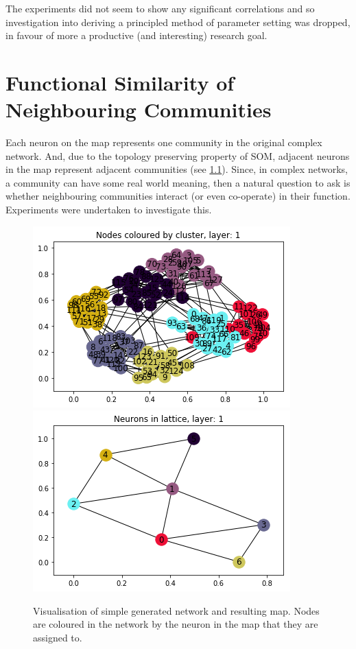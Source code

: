 \documentclass{report}
\begin{document}
	The experiments did not seem to show any significant correlations and so investigation into deriving a principled method of parameter setting was dropped, in favour of more a productive (and interesting) research goal.
	
	
	\chapter{Functional Similarity of Neighbouring Communities}
	
	Each neuron on the map represents one community in the original complex network. And, due to the topology preserving property of SOM, adjacent neurons in the map represent adjacent communities (see \cref{colouring}). Since, in complex networks, a community can have some real world meaning, then a natural question to ask is whether neighbouring communities interact (or even co-operate) in their function. Experiments were undertaken to investigate this. 
	
	\begin{figure}
		\centering
		\includegraphics[width=\textwidth]{../figure2_network.png}
		\includegraphics[width=\textwidth]{../figure2_map.png}
		\caption{Visualisation of simple generated network and resulting map. Nodes are coloured in the network by the neuron in the map that they are assigned to.}
		\label{colouring}
	\end{figure}
	
\end{document}

